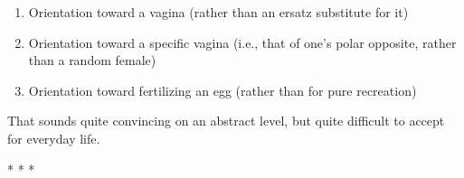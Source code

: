 \begin{enumerate}


\item Orientation toward a vagina (rather than an ersatz substitute for it)

\item Orientation toward a specific vagina (i.e., that of one's polar opposite, rather than a random female)

\item Orientation toward fertilizing an egg (rather than for pure recreation)
\end{enumerate}


That sounds quite convincing on an abstract level, but quite difficult to accept for everyday life.



\begin{center}* * *\end{center}

